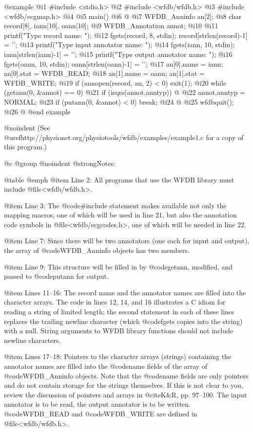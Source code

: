 {{{{{{{{{@example
 @i{1}  #include <stdio.h>
 @i{2}  #include <wfdb/wfdb.h>
 @i{3}  #include <wfdb/ecgmap.h>
 @i{4}
 @i{5}  main()
 @i{6}  @{
 @i{7}      WFDB_Anninfo an[2];
 @i{8}      char record[8], iann[10], oann[10];
 @i{9}      WFDB_Annotation annot;
@i{10}
@i{11}      printf("Type record name: ");
@i{12}      fgets(record, 8, stdin); record[strlen(record)-1] = '\0';
@i{13}      printf("Type input annotator name: ");
@i{14}      fgets(iann, 10, stdin); iann[strlen(iann)-1] = '\0';
@i{15}      printf("Type output annotator name: ");
@i{16}      fgets(oann, 10, stdin); oann[strlen(oann)-1] = '\0';
@i{17}      an[0].name = iann; an[0].stat = WFDB_READ;
@i{18}      an[1].name = oann; an[1].stat = WFDB_WRITE;
@i{19}      if (annopen(record, an, 2) < 0) exit(1);
@i{20}      while (getann(0, &annot) == 0)
@i{21}          if (isqrs(annot.anntyp)) @{
@i{22}              annot.anntyp = NORMAL;
@i{23}              if (putann(0, &annot) < 0) break;
@i{24}          @}
@i{25}      wfdbquit();
@i{26}  @}
@end example

@noindent
(See @uref{http://physionet.org/physiotools/wfdb/examples/example1.c}
for a copy of this program.)

@c @group
@noindent
@strong{Notes:}

@table @emph
@item Line 2:
All programs that use the WFDB library must include
@file{<wfdb/wfdb.h>}.

@item Line 3:
The @code{#include} statement makes available not only the mapping
macros, one of which will be used in line 21, but also the
annotation code symbols in @file{<wfdb/ecgcodes.h>}, one of which
will be needed in line 22.

@item Line 7:
Since there will be two annotators (one each for input and output),
the array of @code{WFDB_Anninfo} objects has two members.

@item Line 9:
This structure will be filled in by @code{getann}, modified, and passed
to @code{putann} for output.

@item Lines 11--16:
The record name and the annotator names are filled into the character
arrays.  The code in lines 12, 14, and 16 illustrates a C idiom for
reading a string of limited length; the second statement in each of
these lines replaces the trailing newline character (which @code{fgets}
copies into the string) with a null.  String arguments to WFDB library
functions should not include newline characters.

@item Lines 17--18:
Pointers to the character arrays (strings) containing the annotator
names are filled into the @code{name} fields of the array of
@code{WFDB_Anninfo} objects. Note that the @code{name} fields are only
pointers and do not contain storage for the strings themselves.  If this
is not clear to you, review the discussion of pointers and arrays in
@cite{K&R}, pp.  97--100.  The input annotator is to be read, the output
annotator is to be written.  @code{WFDB_READ} and @code{WFDB_WRITE} are
defined in @file{<wfdb/wfdb.h>}.

}}}}}}}}}
